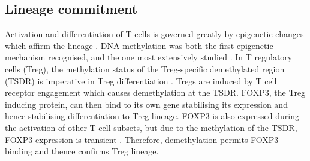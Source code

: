 \documentclass[12pt]{article}
\newcommand{\naive}{na\"{i}ve }
\begin{document}
			
		\subsection{Lineage commitment}
	
			Activation and differentiation of T cells is governed greatly by epigenetic changes which affirm the lineage \citep{Zeng13}.
			DNA methylation was both the first epigenetic mechanism recognised, and the one most extensively studied \citep{Begin14}. 
			In T regulatory cells (Treg), the methylation status of the Treg-specific demethylated region (TSDR) is imperative in Treg differentiation \citep{Polansky08}.
			Tregs are induced by T cell receptor engagement which causes demethylation at the TSDR.
			FOXP3, the Treg inducing protein, can then bind to its own gene stabilising its expression and hence stabilising differentiation to Treg lineage.
			FOXP3 is also expressed during the activation of other T cell subsets, but due to the methylation of the TSDR, FOXP3 expression is transient \citep{Ohkura13}.
			Therefore, demethylation permits FOXP3 binding and thence confirms Treg lineage.
	
%
%		
%			
%		
%	
			
\end{document}
